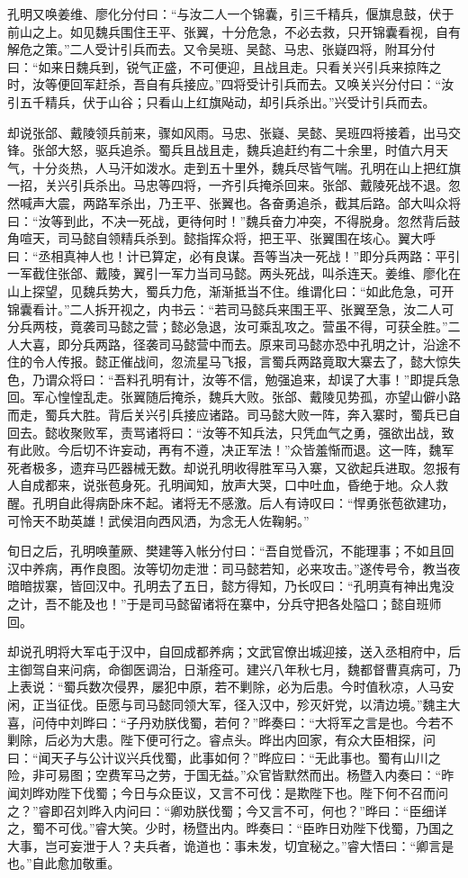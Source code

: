 孔明又唤姜维、廖化分付曰：“与汝二人一个锦囊，引三千精兵，偃旗息鼓，伏于前山之上。如见魏兵围住王平、张翼，十分危急，不必去救，只开锦囊看视，自有解危之策。”二人受计引兵而去。又令吴班、吴懿、马忠、张嶷四将，附耳分付曰：“如来日魏兵到，锐气正盛，不可便迎，且战且走。只看关兴引兵来掠阵之时，汝等便回军赶杀，吾自有兵接应。”四将受计引兵而去。又唤关兴分付曰：“汝引五千精兵，伏于山谷；只看山上红旗飐动，却引兵杀出。”兴受计引兵而去。

却说张郃、戴陵领兵前来，骤如风雨。马忠、张嶷、吴懿、吴班四将接着，出马交锋。张郃大怒，驱兵追杀。蜀兵且战且走，魏兵追赶约有二十余里，时值六月天气，十分炎热，人马汗如泼水。走到五十里外，魏兵尽皆气喘。孔明在山上把红旗一招，关兴引兵杀出。马忠等四将，一齐引兵掩杀回来。张郃、戴陵死战不退。忽然喊声大震，两路军杀出，乃王平、张翼也。各奋勇追杀，截其后路。郃大叫众将曰：“汝等到此，不决一死战，更待何时！”魏兵奋力冲突，不得脱身。忽然背后鼓角喧天，司马懿自领精兵杀到。懿指挥众将，把王平、张翼围在垓心。翼大呼曰：“丞相真神人也！计已算定，必有良谋。吾等当决一死战！”即分兵两路：平引一军截住张郃、戴陵，翼引一军力当司马懿。两头死战，叫杀连天。姜维、廖化在山上探望，见魏兵势大，蜀兵力危，渐渐抵当不住。维谓化曰：“如此危急，可开锦囊看计。”二人拆开视之，内书云：“若司马懿兵来围王平、张翼至急，汝二人可分兵两枝，竟袭司马懿之营；懿必急退，汝可乘乱攻之。营虽不得，可获全胜。”二人大喜，即分兵两路，径袭司马懿营中而去。原来司马懿亦恐中孔明之计，沿途不住的令人传报。懿正催战间，忽流星马飞报，言蜀兵两路竟取大寨去了，懿大惊失色，乃谓众将曰：“吾料孔明有计，汝等不信，勉强追来，却误了大事！”即提兵急回。军心惶惶乱走。张翼随后掩杀，魏兵大败。张郃、戴陵见势孤，亦望山僻小路而走，蜀兵大胜。背后关兴引兵接应诸路。司马懿大败一阵，奔入寨时，蜀兵已自回去。懿收聚败军，责骂诸将曰：“汝等不知兵法，只凭血气之勇，强欲出战，致有此败。今后切不许妄动，再有不遵，决正军法！”众皆羞惭而退。这一阵，魏军死者极多，遗弃马匹器械无数。却说孔明收得胜军马入寨，又欲起兵进取。忽报有人自成都来，说张苞身死。孔明闻知，放声大哭，口中吐血，昏绝于地。众人救醒。孔明自此得病卧床不起。诸将无不感激。后人有诗叹曰：“悍勇张苞欲建功，可怜天不助英雄！武侯泪向西风洒，为念无人佐鞠躬。”

旬日之后，孔明唤董厥、樊建等入帐分付曰：“吾自觉昏沉，不能理事；不如且回汉中养病，再作良图。汝等切勿走泄：司马懿若知，必来攻击。”遂传号令，教当夜暗暗拔寨，皆回汉中。孔明去了五日，懿方得知，乃长叹曰：“孔明真有神出鬼没之计，吾不能及也！”于是司马懿留诸将在寨中，分兵守把各处隘口；懿自班师回。

却说孔明将大军屯于汉中，自回成都养病；文武官僚出城迎接，送入丞相府中，后主御驾自来问病，命御医调治，日渐痊可。建兴八年秋七月，魏都督曹真病可，乃上表说：“蜀兵数次侵界，屡犯中原，若不剿除，必为后患。今时值秋凉，人马安闲，正当征伐。臣愿与司马懿同领大军，径入汉中，殄灭奸党，以清边境。”魏主大喜，问侍中刘晔曰：“子丹劝朕伐蜀，若何？”晔奏曰：“大将军之言是也。今若不剿除，后必为大患。陛下便可行之。睿点头。晔出内回家，有众大臣相探，问曰：“闻天子与公计议兴兵伐蜀，此事如何？”晔应曰：“无此事也。蜀有山川之险，非可易图；空费军马之劳，于国无益。”众官皆默然而出。杨暨入内奏曰：“昨闻刘晔劝陛下伐蜀；今日与众臣议，又言不可伐：是欺陛下也。陛下何不召而问之？”睿即召刘晔入内问曰：“卿劝朕伐蜀；今又言不可，何也？”晔曰：“臣细详之，蜀不可伐。”睿大笑。少时，杨暨出内。晔奏曰：“臣昨日劝陛下伐蜀，乃国之大事，岂可妄泄于人？夫兵者，诡道也：事未发，切宜秘之。”睿大悟曰：“卿言是也。”自此愈加敬重。

